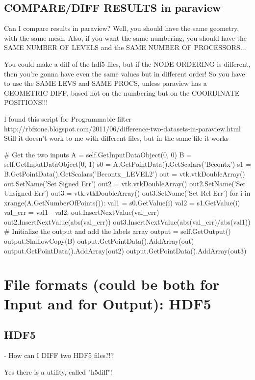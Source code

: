 \documentclass[10pt]{book}
\begin{document}
\chapter{COMPARE/DIFF RESULTS  in paraview}

Can I compare results in paraview?
Well, you should have the same geometry, with the same mesh.
Also, if you want the same numbering,
you should have the SAME NUMBER OF LEVELS 
and the SAME NUMBER OF PROCESSORS...

You could make a diff of the hdf5 files, but if the NODE ORDERING 
is different, then you're gonna have even the same values but in 
different order!
So you have to use the SAME LEVS and SAME PROCS,
unless paraview has a GEOMETRIC DIFF, based not on the numbering 
but on the COORDINATE POSITIONS!!!

I found this script for Programmable filter
http://rbfzone.blogspot.com/2011/06/difference-two-datasets-in-paraview.html
Still it doesn't work to me with different files, but in the same file it works


\# Get the two inputs
A = self.GetInputDataObject(0, 0)
B = self.GetInputDataObject(0, 1)
s0 = A.GetPointData().GetScalars('Becontx')
s1 = B.GetPointData().GetScalars('Becontx\_LEVEL2')
out = vtk.vtkDoubleArray()
out.SetName('Set Signed Err')
out2 = vtk.vtkDoubleArray()
out2.SetName('Set Unsigned Err')
out3 = vtk.vtkDoubleArray()
out3.SetName('Set Rel Err')
for i in xrange(A.GetNumberOfPoints()):
    val1 = s0.GetValue(i)
    val2 = s1.GetValue(i)
    val\_err = val1 - val2;
    out.InsertNextValue(val\_err)
    out2.InsertNextValue(abs(val\_err))
    out3.InsertNextValue(abs(val\_err)/abs(val1))
\# Initialize the output and add the labels array
output = self.GetOutput()
output.ShallowCopy(B)
output.GetPointData().AddArray(out)
output.GetPointData().AddArray(out2)
output.GetPointData().AddArray(out3)



 \part{File formats (could be both for Input and for Output): HDF5}
 
 \chapter{HDF5} 
 
  - How can I DIFF two HDF5 files?!?

   Yes there is a utility, called "h5diff"! 
   
\end{document}
